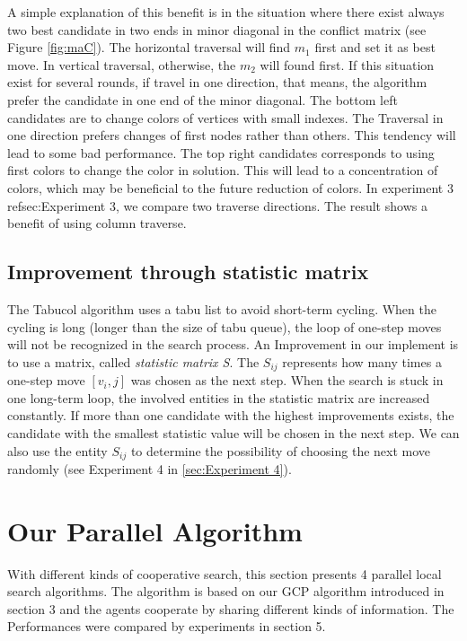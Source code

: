 \documentclass[12pt,a4paper,twoside]{scrartcl}
\numberwithin{equation}{section}
\begin{document}
A simple explanation of this benefit is in the situation where there exist always two best candidate in two ends in minor diagonal in the conflict matrix (see Figure \ref{fig:maC}). The horizontal traversal will find $m_1$ first and set it as best move. In vertical traversal, otherwise, the $m_2$ will found first. If this situation exist for several rounds, if travel in one direction, that means, the algorithm prefer the candidate in one end of the minor diagonal. The bottom left candidates are to change colors of vertices with small indexes. The Traversal in one direction prefers changes of first nodes rather than others. This tendency will lead to some bad performance.
The top right candidates corresponds to using first colors to change the color in solution. This will lead to a concentration of colors, which may be beneficial to the future reduction of colors.
In experiment 3 ref{sec:Experiment 3}, we compare two traverse directions. The result shows a benefit of using column traverse.
\fi
\subsection{Improvement through statistic matrix}
\label{subsec:statistic}
The Tabucol algorithm uses a tabu list to avoid short-term cycling. When the cycling is long (longer than the size of tabu queue), the loop of one-step moves will not be recognized in the search process. An Improvement in our implement is to use a matrix, called \emph{statistic matrix S}. The $S_{ij}$ represents how many times a one-step move $[v_i,j]$ was chosen as the next step. When the search is stuck in one long-term loop, the involved entities in the statistic matrix are increased constantly. If more than one candidate with the highest improvements exists, the candidate with the smallest statistic value will be chosen in the next step. We can also use the entity $S_{ij}$ to determine the possibility of choosing the next move randomly (see Experiment 4 in      \ref{sec:Experiment 4}). \\
\clearpage
\section{Our Parallel Algorithm}
\label{sec:Our parallel Algorithm}
With different kinds of cooperative search, this section presents 4 parallel local search algorithms. The algorithm is based on our GCP algorithm introduced in section 3 and the agents cooperate by sharing different kinds of information. The Performances were compared by experiments in section 5.
\end{document}
